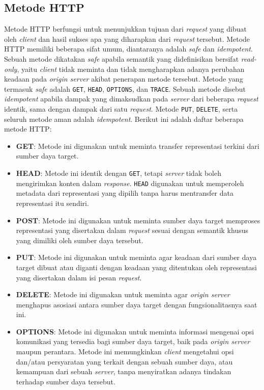 \subsection{Metode HTTP}
\label{subsec:0201-metode-http}

Metode HTTP berfungsi untuk menunjukkan tujuan dari \textit{request} yang dibuat oleh \textit{client} dan hasil sukses apa yang diharapkan dari \textit{request} tersebut. Metode HTTP memiliki beberapa sifat umum, diantaranya adalah \textit{safe} dan \textit{idempotent}. Sebuah metode dikatakan \textit{safe} apabila semantik yang didefinisikan bersifat \textit{read-only}, yaitu \textit{client} tidak meminta dan tidak mengharapkan adanya perubahan keadaan pada \textit{origin server} akibat penerapan metode tersebut. Metode yang termasuk \textit{safe} adalah \texttt{GET}, \texttt{HEAD}, \texttt{OPTIONS}, dan \texttt{TRACE}. Sebuah metode disebut \textit{idempotent} apabila dampak yang dimaksudkan pada \textit{server} dari beberapa \textit{request} identik, sama dengan dampak dari satu \textit{request}. Metode \texttt{PUT}, \texttt{DELETE}, serta seluruh metode aman adalah \textit{idempotent}. Berikut ini adalah daftar beberapa metode HTTP:

\begin{itemize}
    \item \textbf{GET}: Metode ini digunakan untuk meminta transfer representasi terkini dari sumber daya target.
  
    \item \textbf{HEAD}: Metode ini identik dengan \texttt{GET}, tetapi \textit{server} tidak boleh mengirimkan konten dalam \textit{response}. \texttt{HEAD} digunakan untuk memperoleh metadata dari representasi yang dipilih tanpa harus mentransfer data representasi itu sendiri.
  
    \item \textbf{POST}: Metode ini digunakan untuk meminta sumber daya target memproses representasi yang disertakan dalam \textit{request} sesuai dengan semantik khusus yang dimiliki oleh sumber daya tersebut.
  
    \item \textbf{PUT}: Metode ini digunakan untuk meminta agar keadaan dari sumber daya target dibuat atau diganti dengan keadaan yang ditentukan oleh representasi yang disertakan dalam isi pesan \textit{request}.
  
    \item \textbf{DELETE}: Metode ini digunakan untuk meminta agar \textit{origin server} menghapus asosiasi antara sumber daya target dengan fungsionalitasnya saat ini.
  
    \item \textbf{OPTIONS}: Metode ini digunakan untuk meminta informasi mengenai opsi komunikasi yang tersedia bagi sumber daya target, baik pada \textit{origin server} maupun perantara. Metode ini memungkinkan \textit{client} mengetahui opsi dan/atau persyaratan yang terkait dengan sebuah sumber daya, atau kemampuan dari sebuah \textit{server}, tanpa menyiratkan adanya tindakan terhadap sumber daya tersebut.
  
\end{itemize}



